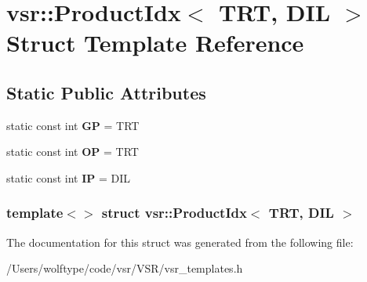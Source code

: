 \hypertarget{structvsr_1_1_product_idx_3_01_t_r_t_00_01_d_i_l_01_4}{\section{vsr\-:\-:Product\-Idx$<$ T\-R\-T, D\-I\-L $>$ Struct Template Reference}
\label{structvsr_1_1_product_idx_3_01_t_r_t_00_01_d_i_l_01_4}
}
\subsection*{Static Public Attributes}
\begin{DoxyCompactItemize}
\item 
\hypertarget{structvsr_1_1_product_idx_3_01_t_r_t_00_01_d_i_l_01_4_ab50fe62ad043e398fb0235d78091bf20}{static const int {\bfseries G\-P} = T\-R\-T}\label{structvsr_1_1_product_idx_3_01_t_r_t_00_01_d_i_l_01_4_ab50fe62ad043e398fb0235d78091bf20}

\item 
\hypertarget{structvsr_1_1_product_idx_3_01_t_r_t_00_01_d_i_l_01_4_a78f3195d836e2afb93692fd45ab4460a}{static const int {\bfseries O\-P} = T\-R\-T}\label{structvsr_1_1_product_idx_3_01_t_r_t_00_01_d_i_l_01_4_a78f3195d836e2afb93692fd45ab4460a}

\item 
\hypertarget{structvsr_1_1_product_idx_3_01_t_r_t_00_01_d_i_l_01_4_a267c68ffdcbf5102005bdf467448bb9b}{static const int {\bfseries I\-P} = D\-I\-L}\label{structvsr_1_1_product_idx_3_01_t_r_t_00_01_d_i_l_01_4_a267c68ffdcbf5102005bdf467448bb9b}

\end{DoxyCompactItemize}
\subsubsection*{template$<$$>$ struct vsr\-::\-Product\-Idx$<$ T\-R\-T, D\-I\-L $>$}



The documentation for this struct was generated from the following file\-:\begin{DoxyCompactItemize}
\item 
/\-Users/wolftype/code/vsr/\-V\-S\-R/vsr\-\_\-templates.\-h\end{DoxyCompactItemize}
